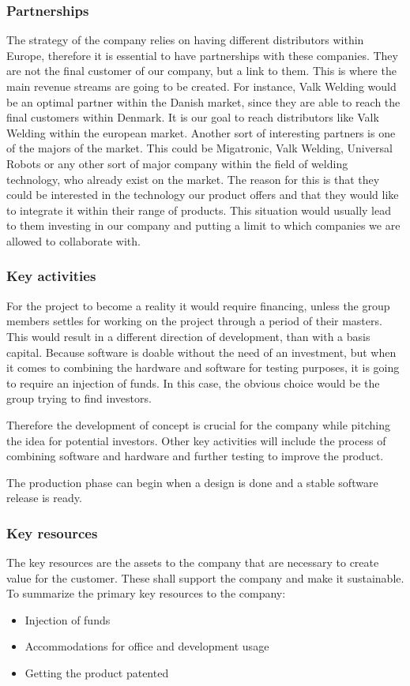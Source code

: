 \subsubsection{Partnerships}
The strategy of the company relies on having different distributors within Europe, therefore it is essential to have partnerships with these companies. They are not the final customer of our company, but a link to them. This is where the main revenue streams are going to be created.
For instance, Valk Welding would be an optimal partner within the Danish market, since they are able to reach the final customers within Denmark. It is our goal to reach distributors like Valk Welding within the european market.
Another sort of interesting partners is one of the majors of the market. This could be Migatronic, Valk Welding, Universal Robots or any other sort of major company within the field of welding technology, who already exist on the market. The reason for this is that they could be interested in the technology our product offers and that they would like to integrate it within their range of products. This situation would usually lead to them investing in our company and putting a limit to which companies we are allowed to collaborate with.

\subsubsection{Key activities}
For the project to become a reality it would require financing, unless the group members settles for working on the project through a period of their masters. This would result in a different direction of development, than with a basis capital. Because software is doable without the need of an investment, but when it comes to combining the hardware and software for testing purposes, it is going to require an injection of funds. In this case, the obvious choice would be the group trying to find investors.

Therefore the development of concept is crucial for the company while pitching the idea for potential investors. Other key activities will include the process of combining software and hardware and further testing to improve the product. 

The production phase can begin when a design is done and a stable software release is ready. 

\subsubsection{Key resources}
The key resources are the assets to the company that are necessary to create value for the customer. These shall support the company and make it sustainable.
To summarize the primary key resources to the company:
\begin{itemize}
\item Injection of funds
\item Accommodations for office and development usage
\item Getting the product patented
\end{itemize}

